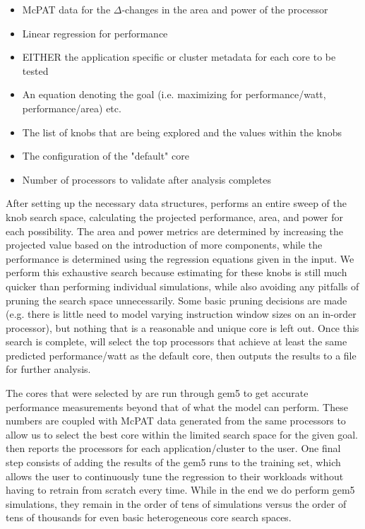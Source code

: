 \begin{itemize}
\item McPAT data for the $\Delta$-changes in the area and power of the processor
\item Linear regression for performance
\item EITHER the application specific or cluster metadata for each core to be tested
\item An equation denoting the goal (i.e. maximizing for performance/watt, performance/area) etc.
\item The list of knobs that are being explored and the values within the knobs
\item The configuration of the "default" core
\item Number of processors to validate after \blackBox{} analysis completes
\end{itemize}

After setting up the necessary data structures, \blackBox{} performs
an entire sweep of the knob search space, calculating the projected
performance, area, and power for each possibility. The area and power
metrics are determined by increasing the projected value based on the
introduction of more components, while the performance is determined
using the regression equations given in the input. We perform this
exhaustive search because estimating for these knobs is still much
quicker than performing individual simulations, while also avoiding
any pitfalls of pruning the search space unnecessarily. Some basic pruning
decisions are made (e.g. there is little need to model varying instruction 
window sizes on an in-order processor), but nothing that is a reasonable and
unique core is left out. Once this search is
complete, \blackBox{} will select the top processors that achieve at least
the same predicted performance/watt as the default core, 
then outputs the results to a file for further analysis.

The cores that were selected by \blackBox{} are run through gem5 to 
get accurate performance measurements beyond that of what the model 
can perform. These numbers are coupled with McPAT data generated from the
same processors to allow us to select the best core within the limited
search space for the given goal. \blackBox{} then reports
the processors for each application/cluster to the user. One final
step consists of adding the results of the gem5 runs to the training
set, which allows the user to continuously tune the regression to
their workloads without having to retrain from scratch every
time. While in the end we do perform gem5 simulations, they remain in
the order of tens of simulations versus the order of tens of thousands
for even basic heterogeneous core search spaces. 

